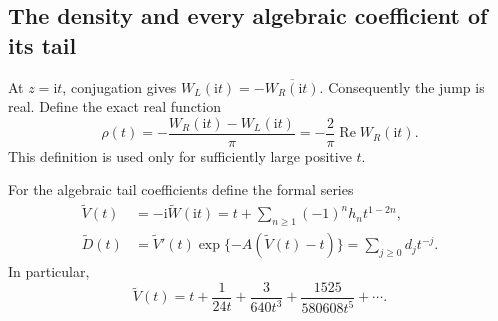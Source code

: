 \documentclass[11pt,a4paper]{article}
\theoremstyle{definition}
\numberwithin{equation}{section}
\newcommand{\ii}{\mathrm{i}}
\newcommand{\Wformal}{\widetilde W}
\newcommand{\Vformal}{\widetilde V}
\newcommand{\Dformal}{\widetilde D}
\begin{document}
\subsection{The density and every algebraic coefficient of its tail}
At $z=\ii t$, conjugation gives
$W_L(\ii t)=-\overline{W_R(\ii t)}$. Consequently the jump is real.
Define the exact real function
\begin{equation}
 \rho(t)=-\frac{W_R(\ii t)-W_L(\ii t)}\pi
         =-\frac2\pi\operatorname{Re}W_R(\ii t).
 \label{eq:rho}
\end{equation}
This definition is used only for sufficiently large positive $t$.

For the algebraic tail coefficients define the formal series
\begin{align}
 \Vformal(t)&=-\ii\Wformal(\ii t)
     =t+\sum_{n\ge1}(-1)^nh_nt^{1-2n},\label{eq:V}\\
 \Dformal(t)&=\Vformal'(t)
                \exp\{-A(\Vformal(t)-t)\}
       =\sum_{j\ge0}d_jt^{-j}.\label{eq:D}
\end{align}
In particular,
\begin{equation}
 \Vformal(t)=t+\frac1{24t}+\frac3{640t^3}
                  +\frac{1525}{580608t^5}+\cdots.
 \label{eq:Vfirst}
\end{equation}
\end{document}
